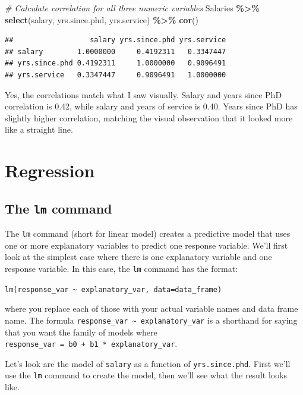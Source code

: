 \documentclass[
]{article}
\newenvironment{Shaded}{\begin{snugshade}}{\end{snugshade}}
\newcommand{\CommentTok}[1]{\textcolor[rgb]{0.56,0.35,0.01}{\textit{#1}}}
\newcommand{\FunctionTok}[1]{\textcolor[rgb]{0.13,0.29,0.53}{\textbf{#1}}}
\newcommand{\NormalTok}[1]{#1}
\newcommand{\SpecialCharTok}[1]{\textcolor[rgb]{0.81,0.36,0.00}{\textbf{#1}}}
\begin{document}
\begin{Shaded}
\begin{Highlighting}[]
\CommentTok{\# Calculate correlation for all three numeric variables}
\NormalTok{Salaries }\SpecialCharTok{\%\textgreater{}\%} \FunctionTok{select}\NormalTok{(salary, yrs.since.phd, yrs.service) }\SpecialCharTok{\%\textgreater{}\%} \FunctionTok{cor}\NormalTok{()}
\end{Highlighting}
\end{Shaded}

\begin{verbatim}
##                  salary yrs.since.phd yrs.service
## salary        1.0000000     0.4192311   0.3347447
## yrs.since.phd 0.4192311     1.0000000   0.9096491
## yrs.service   0.3347447     0.9096491   1.0000000
\end{verbatim}

Yes, the correlations match what I saw visually. Salary and years since
PhD correlation is 0.42, while salary and years of service is 0.40.
Years since PhD has slightly higher correlation, matching the visual
observation that it looked more like a straight line.

\hypertarget{regression}{%
\section{Regression}\label{regression}}

\hypertarget{the-lm-command}{%
\subsection{\texorpdfstring{The \texttt{lm}
command}{The lm command}}\label{the-lm-command}}

The \texttt{lm} command (short for linear model) creates a predictive
model that uses one or more explanatory variables to predict one
response variable. We'll first look at the simplest case where there is
one explanatory variable and one response variable. In this case, the
\texttt{lm} command has the format:

\texttt{lm(response\_var\ \textasciitilde{}\ explanatory\_var,\ data=data\_frame)}

where you replace each of those with your actual variable names and data
frame name. The formula
\texttt{response\_var\ \textasciitilde{}\ explanatory\_var} is a
shorthand for saying that you want the family of models where
\texttt{response\_var\ =\ b0\ +\ b1\ *\ explanatory\_var}.

Let's look are the model of \texttt{salary} as a function of
\texttt{yrs.since.phd}. First we'll use the \texttt{lm} command to
create the model, then we'll see what the result looks like.
\end{document}
